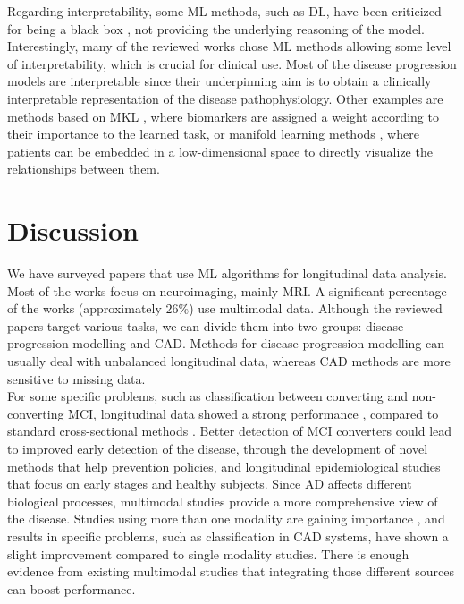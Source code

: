Regarding interpretability, some ML methods, such as DL, have been criticized for being a black box \cite{Ching2018}, not providing the underlying reasoning of the model. Interestingly, many of the reviewed works chose ML methods allowing some level of interpretability, which is crucial for clinical use. Most of the disease progression models are interpretable since their underpinning aim is to obtain a clinically interpretable representation of the disease pathophysiology. Other examples are methods based on MKL \cite{Chen2015,Gonen2011,Zhang2012a}, where biomarkers are assigned a weight according to their importance to the learned task, or manifold learning methods \cite{Guerrero2015,guerrero,Wolz2010}, where patients can be embedded in a low-dimensional space to directly visualize the relationships between them.

\section{Discussion}
\label{sec:conclusion}

We have surveyed papers that use ML algorithms for longitudinal data analysis. Most of the works focus on neuroimaging, mainly MRI. A significant percentage of the works (approximately $26\%$) use multimodal data. Although the reviewed papers target various tasks, we can divide them into two groups: disease progression modelling and CAD. Methods for disease progression modelling can usually deal with unbalanced longitudinal data, whereas CAD methods are more sensitive to missing data. \\

For some specific problems, such as classification between converting and non-converting MCI, longitudinal data showed a strong performance \cite{Liu2013,Sun2017}, compared to standard cross-sectional methods \cite{cuingnet}. Better detection of MCI converters could lead to improved early detection of the disease, through the development of novel methods that help prevention policies, and longitudinal epidemiological studies that focus on early stages and healthy subjects. Since AD affects different biological processes, multimodal studies provide a more comprehensive view of the disease. Studies using more than one modality are gaining importance \cite{Chen2015,Chi2017,Hinrichs2011,Minhas2016,Zhang2012a}, and results in specific problems, such as classification in CAD systems, have shown a slight improvement compared to single modality studies. There is enough evidence from existing multimodal studies \cite{Iturria-Medina2016,Jedynak2012,Oxtoby2018} that integrating those different sources can boost performance. \\

